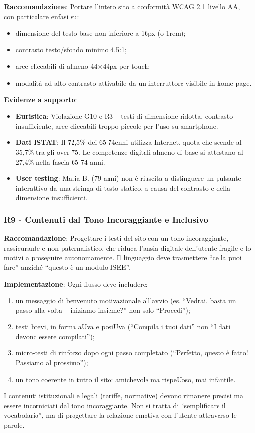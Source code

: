 ﻿\documentclass[11pt,a4paper]{article}
\begin{document}
\textbf{Raccomandazione}: Portare l'intero sito a conformit\`a WCAG 2.1 livello
AA, con particolare enfasi su:
\begin{itemize}
    \item dimensione del testo base non inferiore a 16px (o 1rem);
    \item contrasto testo/sfondo minimo 4.5:1;
    \item aree cliccabili di almeno 44×44px per touch;
    \item modalit\`a ad alto contrasto attivabile da un interruttore visibile
    in home page.
\end{itemize}

\textbf{Evidenze a supporto}:
\begin{itemize}
    \item \textbf{Euristica}: Violazione G10 e R3 -- testi di dimensione ridotta,
    contrasto insufficiente, aree cliccabili troppo piccole per l'uso su
    smartphone.
    \item \textbf{Dati ISTAT}: Il 72,5\% dei 65-74enni utilizza Internet,
    quota che scende al 35,7\% tra gli over 75. Le competenze digitali almeno
    di base si attestano al 27,4\% nella fascia 65-74 anni.
    \item \textbf{User testing}: Maria B. (79 anni) non \`e riuscita a distinguere
    un pulsante interattivo da una stringa di testo statico, a causa del
    contrasto e della dimensione insufficienti.
\end{itemize}

\subsubsection{R9 - Contenuti dal Tono Incoraggiante e Inclusivo}
\label{rec:R9}

\textbf{Raccomandazione}: Progettare i testi del sito con un tono
incoraggiante, rassicurante e non paternalistico, che riduca l'ansia
digitale dell'utente fragile e lo motivi a proseguire autonomamente.
Il linguaggio deve trasmettere ``ce la puoi fare'' anzich\'e ``questo \`e
un modulo ISEE''.

\textbf{Implementazione}: Ogni flusso deve includere:
\begin{enumerate}
    \item un messaggio di benvenuto motivazionale all'avvio (es. ``Vedrai,
    basta un passo alla volta -- iniziamo insieme?'' non solo ``Procedi'');
    \item testi brevi, in forma aUva e posiUva (``Compila i tuoi dati''
    non ``I dati devono essere compilati'');
    \item micro-testi di rinforzo dopo ogni passo completato (``Perfetto,
    questo \`e fatto! Passiamo al prossimo'');
    \item un tono coerente in tutto il sito: amichevole ma rispeUoso,
    mai infantile.
\end{enumerate}
I contenuti istituzionali e legali (tariffe, normative) devono rimanere
precisi ma essere incorniciati dal tono incoraggiante. Non si tratta di
``semplificare il vocabolario'', ma di progettare la relazione emotiva
con l'utente attraverso le parole.
\end{document}
